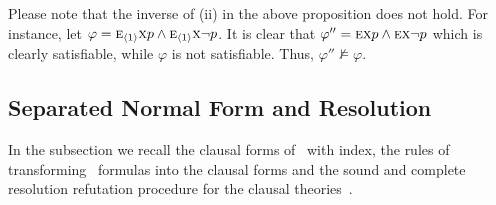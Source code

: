 \documentclass[twoside,11pt]{article}
\begin{document}
Please note that the inverse of (ii) in the above proposition does not hold. For instance,
let $\varphi=\textsc{e}_{{\langle{1}\rangle}}\textsc{x} p \land \textsc{e}_{{\langle{1}\rangle}}\textsc{x} \neg p$. It is clear that
$\varphi'' = \textsc{e}\textsc{x} p \land \textsc{e}\textsc{x} \neg p$ which is clearly satisfiable, while $\varphi$
is not satisfiable. Thus, $\varphi''\not\models\varphi$.





\subsection{Separated Normal Form and Resolution}
In the subsection we recall the clausal forms of \CTL\ with index, the  rules of transforming \CTL\ formulas into
the clausal forms and the sound and complete resolution refutation procedure for the clausal theories~\cite{zhang2014resolution}.
\end{document}
